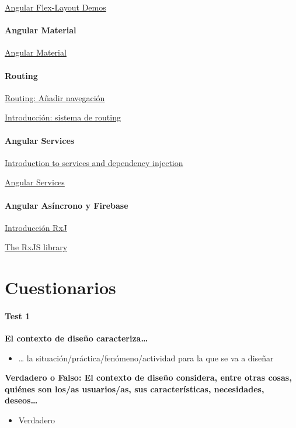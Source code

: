 \documentclass[12pt, twoside, openright]{report} %
\begin{document}
\href{https://tburleson-layouts-demos.firebaseapp.com/#/docs}{Angular Flex-Layout Demos}

\subsubsection{Angular Material}
\href{https://material.angular.io/}{Angular Material}

\subsubsection{Routing}
\href{https://angular.io/start/start-routing}{Routing: Añadir navegación}

\href{https://desarrolloweb.com/articulos/introduccion-sistema-routing-angular.html}{Introducción: sistema de routing}

\subsubsection{Angular Services}
\href{https://angular.io/guide/architecture-services}{Introduction to services and dependency injection}

\href{https://desarrolloweb.com/articulos/servicios-angular.html}{Angular Services}

\subsubsection{Angular Asíncrono y Firebase}
\href{https://rxjs-dev.firebaseapp.com/guide/overview}{Introducción RxJ}

\href{https://angular.io/guide/rx-library}{The RxJS library}

\chapter{Cuestionarios}

\subsubsection{Test 1}

\textbf{El contexto de diseño caracteriza\ldots{}}
\begin{itemize}
	\item \ldots{} la situación/práctica/fenómeno/actividad para la que se va a diseñar
\end{itemize}

\textbf{Verdadero o Falso: El contexto de diseño considera, entre otras cosas, quiénes son los/as usuarios/as, sus características, necesidades, deseos\ldots{}}
\begin{itemize}
	\item Verdadero
\end{itemize}
\end{document}
